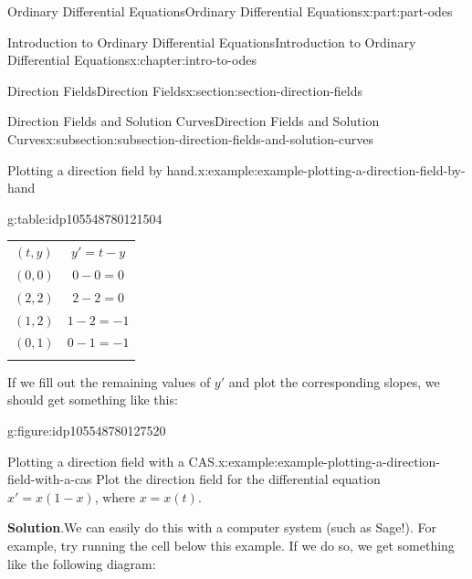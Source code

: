 \documentclass[oneside,10pt,]{book}
\newcommand{\blocktitlefont}{\relax}
\numberwithin{equation}{part}
\newcommand{\hrulethin}  {\noalign{\hrule height 0.04em}}
\newcommand{\hrulethick} {\noalign{\hrule height 0.11em}}
\begin{document}
\begin{partptx}{Ordinary Differential Equations}{}{Ordinary Differential Equations}{}{}{x:part:part-odes}
\begin{chapterptx}{Introduction to Ordinary Differential Equations}{}{Introduction to Ordinary Differential Equations}{}{}{x:chapter:intro-to-odes}
\begin{sectionptx}{Direction Fields}{}{Direction Fields}{}{}{x:section:section-direction-fields}
\begin{subsectionptx}{Direction Fields and Solution Curves}{}{Direction Fields and Solution Curves}{}{}{x:subsection:subsection-direction-fields-and-solution-curves}
\begin{example}{Plotting a direction field by hand.}{x:example:example-plotting-a-direction-field-by-hand}
\begin{tableptx}{\textbf{}}{g:table:idp105548780121504}{}
{\begin{tabular}{cc}
\((t,y)\)&\(y' = t-y\)\tabularnewline\hrulethin
\((0,0)\)&\(0-0 = 0\)\tabularnewline\hrulethin
\((2,2)\)&\(2-2=0\)\tabularnewline\hrulethin
\((1,2)\)&\(1-2 = -1\)\tabularnewline\hrulethin
\((0,1)\)&\(0-1=-1\)\tabularnewline\hrulethick
\end{tabular}
}%
\end{tableptx}%
 If we fill out the remaining values of \(y'\) and plot the corresponding slopes, we should get something like this:%
\begin{figureptx}{}{g:figure:idp105548780127520}{}%
\begin{image}{0.25}{0.5}{0.25}%
%
\end{image}%
\tcblower
\end{figureptx}%
\end{example}
\begin{example}{Plotting a direction field with a CAS.}{x:example:example-plotting-a-direction-field-with-a-cas}%
Plot the direction field for the differential equation \(x' = x(1-x)\), where \(x=x(t)\).%
\par\smallskip%
\noindent\textbf{\blocktitlefont Solution}.\hypertarget{g:solution:idp105548780129824}{}\quad{}We can easily do this with a computer system (such as Sage!). For example, try running the cell below this example. If we do so, we get something like the following diagram:%

\end{example}
\end{subsectionptx}
\end{sectionptx}
\end{chapterptx}
\end{partptx}
\end{document}
